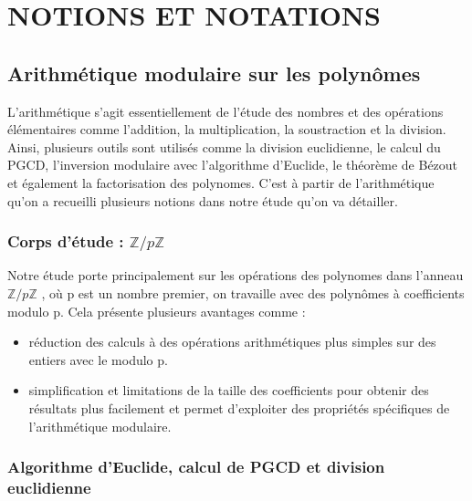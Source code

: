 \documentclass[a4paper]{article}
\begin{document}
\section{NOTIONS ET NOTATIONS}

\subsection{Arithmétique modulaire sur les polynômes}

L'arithmétique s'agit essentiellement de l'étude des nombres et des opérations élémentaires comme l'addition, la multiplication, la soustraction et la division. Ainsi, plusieurs outils sont utilisés comme la division euclidienne, le calcul du PGCD, l'inversion modulaire avec l'algorithme d'Euclide, le théorème de Bézout et également la factorisation des polynomes. C'est à partir de l'arithmétique qu'on a recueilli plusieurs notions dans notre étude qu'on va détailler.

 \subsubsection{Corps d'étude : ${\mathbb{Z}/p \mathbb{Z}}$}
 
Notre étude porte principalement sur les opérations des polynomes dans l'anneau ${\mathbb{Z}/p \mathbb{Z}}$ , où p est un nombre premier, on travaille avec des polynômes à coefficients modulo p. Cela présente plusieurs avantages comme :
	\begin{itemize}

  		\item réduction des calculs à des opérations arithmétiques plus simples sur des entiers avec le modulo p.
  		\item simplification et limitations de la taille des coefficients pour obtenir des résultats plus facilement et permet d'exploiter des propriétés spécifiques de l'arithmétique modulaire.
  
	\end{itemize}
	
 \subsubsection{Algorithme d'Euclide, calcul de PGCD et division euclidienne}
 
\end{document}

